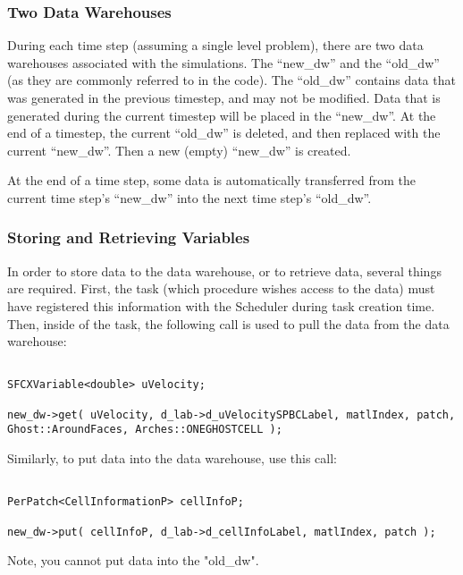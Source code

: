 \documentclass[11pt,fleqn]{book} %
\begin{document}
\subsubsection{Two Data Warehouses}

During each time step (assuming a single level problem), there are two data warehouses associated with the simulations. 
The ``new\_dw'' and the ``old\_dw'' (as they are commonly referred to in the code). The ``old\_dw'' contains data that 
was generated in the previous timestep, and may not be modified. Data that is generated during the current timestep will 
be placed in the ``new\_dw''. At the end of a timestep, the current ``old\_dw'' is deleted, and then replaced with the 
current ``new\_dw''. Then a new (empty) ``new\_dw'' is created.

At the end of a time step, some data is automatically transferred from the current time step's ``new\_dw'' into the next 
time step's ``old\_dw''. 

\subsubsection{Storing and Retrieving Variables}

In order to store data to the data warehouse, or to retrieve data, several things are required. First, the task (which 
procedure wishes access to the data) must have registered this information with the Scheduler during task creation time. 
Then, inside of the task, the following call is used to pull the data from the data warehouse: 

\begin{verbatim}

SFCXVariable<double> uVelocity;

new_dw->get( uVelocity, d_lab->d_uVelocitySPBCLabel, matlIndex, patch, Ghost::AroundFaces, Arches::ONEGHOSTCELL ); 

\end{verbatim}

Similarly, to put data into the data warehouse, use this call: 

\begin{verbatim}

PerPatch<CellInformationP> cellInfoP;

new_dw->put( cellInfoP, d_lab->d_cellInfoLabel, matlIndex, patch ); 

\end{verbatim}

Note, you cannot put data into the "old\_dw". 
\end{document}
